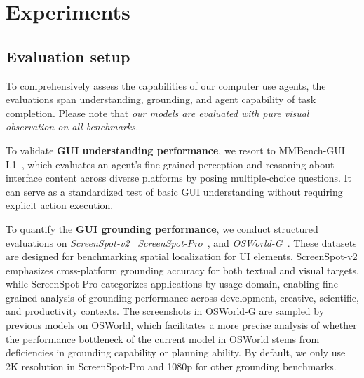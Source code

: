 \documentclass{article} %
\begin{document}
\section{Experiments}
\label{sec:exp}

\subsection{Evaluation setup}

To comprehensively assess the capabilities of our computer use agents, the evaluations span understanding, grounding, and agent capability of task completion. Please note that \textit{our models are evaluated with pure visual observation on all benchmarks.} 


To validate \textbf{GUI understanding performance}, we resort to MMBench-GUI L1~\citep{wang2025mmbenchgui}, which evaluates an agent’s fine-grained perception and reasoning about interface content across diverse platforms by posing multiple-choice questions. It can serve as a standardized test of basic GUI understanding without requiring explicit action execution.

To quantify the \textbf{GUI grounding performance}, we conduct structured evaluations on \textit{ScreenSpot-v2}~\citep{wu2024osatlas} \textit{ScreenSpot-Pro}~\citep{li2025screenspotpro}, and \textit{OSWorld-G}~\citep{xie2025scalingcomputerusegroundinguser}. These datasets are designed for benchmarking spatial localization for UI elements. ScreenSpot-v2 emphasizes cross-platform grounding accuracy for both textual and visual targets, while ScreenSpot-Pro categorizes applications by usage domain, enabling fine-grained analysis of grounding performance across development, creative, scientific, and productivity contexts. The screenshots in OSWorld-G are sampled by previous models on OSWorld, which facilitates a more precise analysis of whether the performance bottleneck of the current model in OSWorld stems from deficiencies in grounding capability or planning ability. 
By default, we only use 2K resolution in ScreenSpot-Pro and 1080p for other grounding benchmarks.
\end{document}
